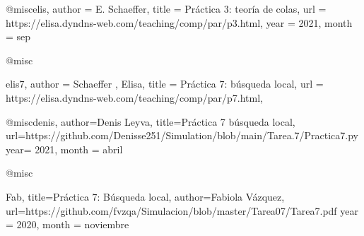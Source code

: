 @misc{elis,
 author =  {E. Schaeffer},
 title = {Práctica 3: teoría de colas},
 url = {https://elisa.dyndns-web.com/teaching/comp/par/p3.html},
 year = 2021,
 month = sep
}

@misc{elis7,
 author =  {Schaeffer , Elisa},
 title = {Práctica 7: búsqueda local},
 url = {https://elisa.dyndns-web.com/teaching/comp/par/p7.html},

}




@misc{denis,
author={Denis Leyva},
title={Práctica 7 búsqueda local},
url={https://github.com/Denisse251/Simulation/blob/main/Tarea.7/Practica7.py}
year= 2021,
month = {abril}
}




@misc{Fab, 
	title={Práctica 7: Búsqueda local},
	author={Fabiola Vázquez},
	url={https://github.com/fvzqa/Simulacion/blob/master/Tarea07/Tarea7.pdf}
	 year = 2020,
     month = {noviembre}

}